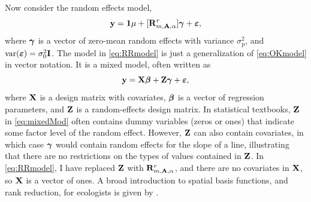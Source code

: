 \documentclass[11pt, titlepage]{article}\usepackage[]{graphicx}\usepackage[]{color}
\begin{document}
\begin{spacing}{1.9}
\begin{flushleft}
Now consider the random effects model,
\begin{equation} \label{eq:RRmodel}
	\mathbf{y} = \mathbf{1}\mu + [\mathbf{R}^r_{m,\mathbf{A},\alpha}]\mbox{\boldmath $\gamma$} + \mbox{\boldmath $\varepsilon$},
\end{equation}
where $\mbox{\boldmath $\gamma$}$ is a vector of zero-mean random effects with variance $\sigma^2_\textrm{p}$, and $\textrm{var}(\mbox{\boldmath $\varepsilon$}) = \sigma^2_0 \mathbf{I}$.  The model in \ref{eq:RRmodel} is just a generalization of \ref{eq:OKmodel} in vector notation. It is a mixed model, often written as
\begin{equation} \label{eq:mixedMod}
    \mathbf{y} = \mathbf{X}{\boldsymbol{\beta}} + \mathbf{Z}\mbox{\boldmath $\gamma$} + \mbox{\boldmath $\varepsilon$},
\end{equation}
 where $\mathbf{X}$ is a design matrix with covariates, ${\boldsymbol{\beta}}$ is a vector of regression parameters, and $\mathbf{Z}$ is a random-effects design matrix.  In statistical textbooks, $\mathbf{Z}$ in \ref{eq:mixedMod} often contains dummy variables (zeros or ones) that indicate some factor level of the random effect.  However, $\mathbf{Z}$ can also contain covariates, in which case $\mbox{\boldmath $\gamma$}$ would contain random effects for the slope of a line, illustrating that there are no restrictions on the types of values contained in $\mathbf{Z}$. In \ref{eq:RRmodel}, I have replaced $\mathbf{Z}$ with $\mathbf{R}_{m,\mathbf{A},\alpha}^r$, and there are no covariates in $\mathbf{X}$, so $\mathbf{X}$ is a vector of ones.  A broad introduction to spatial basis functions, and rank reduction, for ecologists is given by \citet{Hefl:Brom:Bros:Bude:basi:2016}.


\end{flushleft}
\end{spacing}
\end{document}
